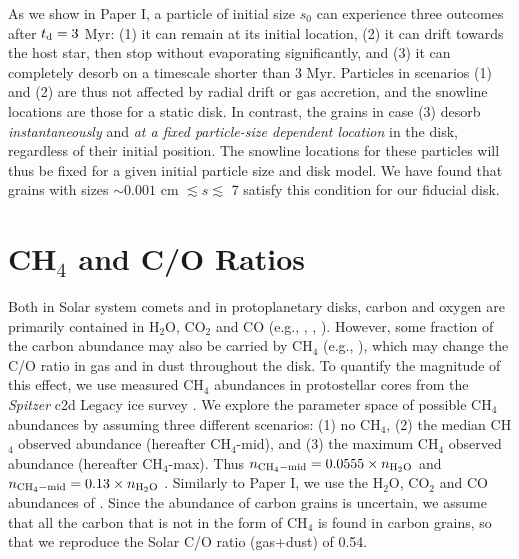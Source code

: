 \documentclass[apj]{emulateapj}
\newcommand{\emgr}[1]{\emph{ \color{gray} #1}}
\begin{document}
As we show in Paper I, a particle of initial size $s_0$ can experience three outcomes after $t_{\rm d}=3$ Myr: (1) it can remain at its initial location, (2) it can drift towards the host star, then stop without evaporating significantly, and (3) it can completely desorb on a timescale shorter than 3 Myr. Particles in scenarios (1) and (2) are thus not affected by radial drift or gas accretion, and the snowline locations are those for a static disk. In contrast, the grains in case (3) desorb \textit{instantaneously} and \textit{at a fixed particle-size dependent location} in the disk, regardless of their initial position. The snowline locations for these particles will thus be fixed for a given initial particle size and disk model. We have found that grains with sizes $\sim0.001$ cm $\lesssim s \lesssim$ 7 satisfy this condition for our fiducial disk. 


\section{CH$_4$ and C/O Ratios}
\label{sec:CH4}

Both in Solar system comets and in protoplanetary disks, carbon and oxygen are primarily contained in H$_2$O, CO$_2$ and CO (e.g., \citealt{rodgers02}, \citealt{lodders03}, \citealt{pontoppidan06}). However, some fraction of the carbon abundance may also be carried by CH$_4$ (e.g., \citealt{mumma96}), which may change the C/O ratio in gas and in dust throughout the disk. To quantify the magnitude of this effect, we use measured CH$_4$ abundances in protostellar cores from the \textit{Spitzer} c2d Legacy ice survey \citep{evans03}. We explore the parameter space of possible CH$_4$ abundances by assuming three different scenarios: (1) no CH$_4$, (2) the median CH$_4$ observed abundance (hereafter CH$_4$-mid), and (3) the maximum CH$_4$ observed abundance (hereafter CH$_4$-max). Thus $n_{\rm CH_4-mid}=0.0555 \times n_{\rm H_2O}$ \citep{oberg11a} and $n_{\rm CH_4-mid}=0.13 \times n_{\rm H_2O}$ \citep{oberg08}. Similarly to Paper I, we use the H$_2$O, CO$_2$ and CO abundances of \citet{oberg11}. Since the abundance of carbon grains is uncertain, we assume that all the carbon that is not in the form of CH$_4$ is found in carbon grains, so that we reproduce the Solar C/O ratio (gas+dust) of 0.54.  
\end{document}
